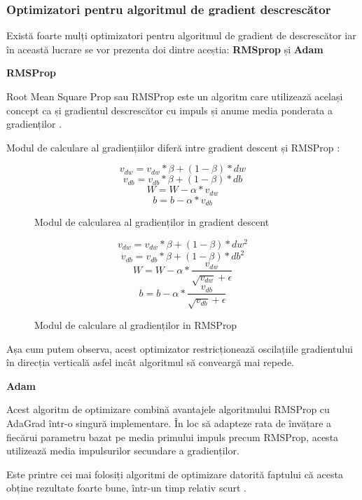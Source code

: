 \documentclass[a4paper, 12pt]{article}
\begin{document}
	\subsubsection{Optimizatori pentru algoritmul de gradient descrescător}
	\quad\space Există foarte mulți optimizatori pentru algoritmul de gradient de descrescător iar în această lucrare se vor prezenta doi dintre aceștia: \textbf{RMSprop} și \textbf{Adam}
	\begin{outline} 
		\1 \textbf{RMSProp} \par
		\bigskip
		\quad Root Mean Square Prop sau RMSProp este un algoritm care utilizează același concept ca și gradientul descrescător cu impuls \textbf{\cite{rizwan_2018_rms}} și anume media ponderata a gradienților .
		
		\quad Modul de calculare al gradiențiilor diferă intre gradient descent și RMSProp \textbf{\cite{gandhi_gandhi_2018}}:
		
		\begin{figure}[H]
			\centering
			\begin{minipage}{0.4\linewidth}
				\[
				v_{dw} = v_{dw} * \beta  + (1-\beta) * dw
				\]
				\[
				v_{db} = v_{db} * \beta  + (1 - \beta) * db
				\]
				\[
				W = W  - \alpha * v_{dw}
				\]
				\[
				b = b - \alpha * v_{db}
				\]
				
				Modul de calcularea al gradienților in gradient descent \textbf{\cite{gandhi_gandhi_2018}}
			\end{minipage}\hfil
			\begin{minipage}{0.4\linewidth}
				\[
				v_{dw} = v_{dw} * \beta  + (1-\beta) * dw^2 
				\]
				\[
				v_{db} = v_{db} * \beta  + (1 - \beta) * db^2
				\]
				\[
				W = W  - \alpha * \frac{v_{dw}}{\sqrt{{v_{dw}}} + \epsilon} 
				\]
				\[
				b = b - \alpha * \frac{v_{db}}{\sqrt{{v_{db}}} + \epsilon}  
				\]
				
				Modul de calculare al gradienților in RMSProp \textbf{\cite{gandhi_gandhi_2018}}
			\end{minipage}\hfil
		\end{figure}
		
		
		
		\quad Așa cum putem observa, acest optimizator restricționează oscilațiile gradientului în direcția verticală asfel incât algoritmul să conveargă mai repede.
		
		
		\1 \textbf{Adam}
		
		\bigskip
		\quad Acest algoritm de optimizare combină avantajele algoritmului RMSProp cu AdaGrad într-o singură implementare. În loc să adapteze rata de învățare a fiecărui parametru bazat pe media primului impuls precum RMSProp, acesta utilizează media impulsurilor secundare  a gradienților.
		
		\quad Este printre cei mai folosiți algoritmi de optimizare datorită faptului că acesta obține rezultate foarte bune, într-un timp relativ scurt .
	\end{outline}
	
\end{document}
